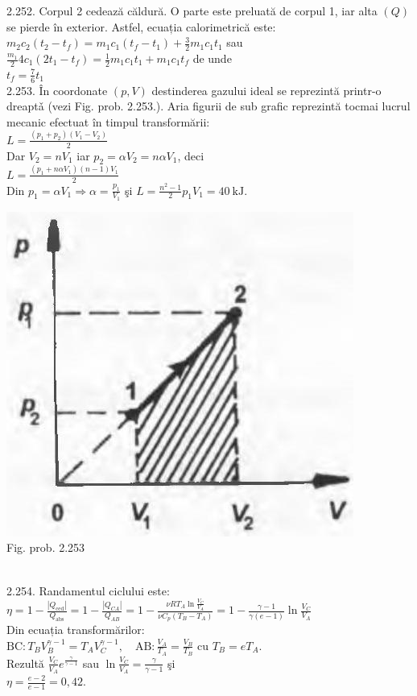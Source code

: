 2.252. Corpul 2 cedează căldură. O parte este preluată de corpul 1, iar alta $(Q)$ se pierde în exterior. Astfel, ecuația calorimetrică este:\\ $m_{2} c_{2}\left(t_{2}-t_{f}\right)=m_{1} c_{1}\left(t_{f}-t_{1}\right)+\frac{3}{2} m_{1} c_{1} t_{1}$ sau\\ $\frac{m_{1}}{2} 4 c_{1}\left(2 t_{1}-t_{f}\right)=\frac{1}{2} m_{1} c_{1} t_{1}+m_{1} c_{1} t_{f}$ de unde\\ $t_{f}=\frac{7}{6} t_{1}$\\

2.253. În coordonate $(p, V)$ destinderea gazului ideal se reprezintă printr-o dreaptǎ (vezi Fig. prob. 2.253.). Aria figurii de sub grafic reprezintă tocmai lucrul mecanic efectuat în timpul transformării:\\ $L=\frac{\left(p_{1}+p_{2}\right)\left(V_{1}-V_{2}\right)}{2}$\\ Dar $V_{2}=n V_{1}$ iar $p_{2}=\alpha V_{2}=n \alpha V_{1}$, deci\\ $L=\frac{\left(p_{1}+n \alpha V_{1}\right)(n-1) V_{1}}{2}$\\ Din $p_{1}=\alpha V_{1} \Rightarrow \alpha=\frac{p_{1}}{V_{1}}$ şi $L=\frac{n^{2}-1}{2} p_{1} V_{1}=40 \mathrm{~kJ}$.\\ \begin{center} \includegraphics[width=0.4\linewidth]{images/2025_07_01_5b3ff9fa0d508c8e9f17g-325(1)}\\ Fig. prob. 2.253 \end{center}\\

2.254. Randamentul ciclului este:\\ $\eta=1-\frac{\left|Q_{\text{ced}}\right|}{Q_{\text{abs}}}=1-\frac{\left|Q_{C A}\right|}{Q_{A B}}=1-\frac{\nu R T_{A} \ln \frac{V_{C}}{V_{A}}}{\nu C_{p}\left(T_{B}-T_{A}\right)}=1-\frac{\gamma-1}{\gamma(e-1)} \ln \frac{V_{C}}{V_{A}}$\\ Din ecuația transformărilor:\\ $\mathrm{BC}: T_{B} V_{B}^{\gamma-1}=T_{A} V_{C}^{\gamma-1}, \quad \mathrm{AB}: \frac{V_{A}}{T_{A}}=\frac{V_{B}}{T_{B}} \text { cu } T_{B}=e T_{A}$.\\ Rezultă $\frac{V_{C}}{V_{A}} e^{\frac{\gamma}{\gamma-1}}$ sau $\ln \frac{V_{C}}{V_{A}}=\frac{\gamma}{\gamma-1}$ şi\\ $\eta=\frac{e-2}{e-1}=0,42$.\\

